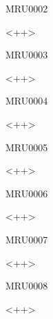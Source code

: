 \documentclass{article}
\begin{document}
\begin{corrige}{MRU0002}

<++>

\end{corrige}%


\begin{corrige}{MRU0003}

<++>

\end{corrige}%


\begin{corrige}{MRU0004}

<++>

\end{corrige}\begin{corrige}{MRU0005}

<++>

\end{corrige}%


\begin{corrige}{MRU0006}

<++>

\end{corrige}%


\begin{corrige}{MRU0007}

<++>

\end{corrige}%


\begin{corrige}{MRU0008}

<++>

\end{corrige}%
\end{document}
